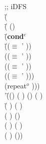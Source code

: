     \begin{ZZZZschemedisplay}%
;; iDFS\\%
\va{$\gt$} \=(  \\%
  \>\PRN \HL \=( ()\\%
  \>  \>\PRN \HL \=(\textbf{cond$^e$}\\%
  \>  \>  \>\PRN \HL \=(($\equiv$ ' ))\\%
  \>  \>  \>  \>(($\equiv$ ' ))\\%
  \>  \>  \>  \>(($\equiv$ ' ))\\%
  \>  \>  \>  \>(($\equiv$ ' )))\\%
  \>  \>  \>(repeat$^o$  )))\\%
'\=(() ( ) () (  )\\%
 \>\PRN \=(   ) ( )\\%
 \> \>(    ) ()\\%
 \> \>(     ) (  )\\%
 \> \>(      ) ())
\end{ZZZZschemedisplay}
	